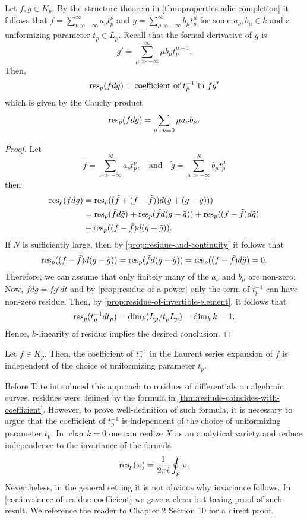 \begin{theorem}\label{thm:resiude-coincides-with-coefficient}
	Let $f,g \in K_{p}$. By the structure theorem in \cref{thm:properties-adic-completion} it follows that $f = \sum_{\nu \gg -\infty}^{\infty} a_{\nu}t_{p}^{\nu}$ and $g = \sum_{\mu \gg -\infty}^{\infty} b_{\mu}t_{p}^{\mu}$ for some $a_{\nu},b_{\mu} \in k$ and a uniformizing parameter $t_{p}\in L_{p} $. Recall that the formal derivative of $g$ is
	\[
		g' = \sum_{\mu \gg -\infty}^{\infty} \mu b_{\mu}t_{p}^{\mu -1}.
	\]
	Then,
	\[
		\operatorname{res}_{p}(fdg) = \text{coefficient of }t_{p}^{-1}\text{ in } fg'
	\]
	which is given by the Cauchy product
	\[
		\operatorname{res}_{p}(fdg) = \sum_{\mu + \nu = 0}\mu a_\nu{}b_{\mu}.
	\]
\end{theorem}
\begin{proof}
	Let
	\[
		\tilde{f} = \sum_{\nu\gg-\infty}^{N} a_{\nu}t_{p}^{\nu},\quad\text{and}\quad\tilde{g} = \sum_{\mu\gg-\infty}^{N} b_{\mu}t_{p}^{\mu}
	\]
	then 
	\begin{align*}
		\operatorname{res}_{p}(fdg) &= \operatorname{res}_{p}( (\tilde{f} + (f - \tilde{f}))d(\tilde{g} + (g - \tilde{g}))) \\
		&= \operatorname{res}_{p}(\tilde{f}d\tilde{g}) + \operatorname{res}_{p}(\tilde{f}d(g - \tilde{g})) + \operatorname{res}_{p}((f-\tilde{f}) d\tilde{g}) \\ &+ \operatorname{res}_{p}( (f - \tilde{f})d(g-\tilde{g})).
	\end{align*}
	If $N$ is sufficiently large, then by \cref{prop:residue-and-continuity} it follows that 
	\[
		\operatorname{res}_{p}( (f - \tilde{f})d(g-\tilde{g})) = \operatorname{res}_{p}(\tilde{f}d(g - \tilde{g})) = \operatorname{res}_{p}((f-\tilde{f}) d\tilde{g}) = 0.
	\]
	Therefore, we can assume that only finitely many of the $a_{\nu}$ and $b_{\mu}$ are non-zero. Now, $fdg = f g' dt$ and by \cref{prop:residue-of-a-power} only the term of $t_{p}^{-1}$ can have non-zero residue. Then, by \cref{prop:residue-of-invertible-element}, it follows that
	\[
		\operatorname{res}_{p}(t_{p}^{-1}dt_{p}) = \dim_{k}(L_{p}/t_{p}L_{p}) = \dim_{k}k = 1. 	
	\]
	Hence, $k$-linearity of residue implies the desired conclusion.
\end{proof}
\begin{corollary}\label{cor:invriance-of-residue-coefficient}
	Let $f\in K_{p}$. Then, the coefficient of $t_{p}^{-1}$ in the Laurent series expansion of $f$ is independent of the choice of uniformizing parameter $t_{p}$.	
\end{corollary}
\begin{remark}\label{rem:previouses-approaches-residues}
	Before Tate introduced this approach to residues of differentials on algebraic curves, residues were defined by the formula in \cref{thm:resiude-coincides-with-coefficient}. However, to prove well-definition of such formula, it is necessary to argue that the coefficient of $t_{p}^{-1}$ is independent of the choice of uniformizing parameter $t_{p}$. In $\operatorname{char}k = 0$ one can realize $X$ as an analytical variety and reduce independence to the invariance of the formula
	\[
		\operatorname{res}_{p}(\omega) = \frac{1}{2\pi i}\oint_{p} \omega.
	\]
	Nevertheless, in the general setting it is not obvious why invariance follows. In \cref{cor:invriance-of-residue-coefficient} we gave a clean but taxing proof of such result. We reference the reader to \cite{serre} Chapter 2 Section 10 for a direct proof.
\end{remark}

